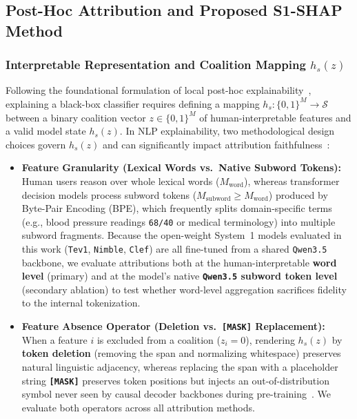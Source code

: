 \documentclass[10pt]{article}
\begin{document}
\subsection{Post-Hoc Attribution and Proposed S1-SHAP Method}
\label{sec:attribution-method}

\subsubsection{Interpretable Representation and Coalition Mapping \texorpdfstring{$h_s(z)$}{h\_s(z)}}
Following the foundational formulation of local post-hoc explainability~\cite{ribeiro2016,lundberg2017}, explaining a black-box classifier requires defining a mapping $h_s: \{0,1\}^M \to \mathcal{S}$ between a binary coalition vector $z \in \{0,1\}^M$ of human-interpretable features and a valid model state $h_s(z)$.
In NLP explainability, two methodological design choices govern $h_s(z)$ and can significantly impact attribution faithfulness~\cite{hooker2019,deyoung2020}:
\begin{itemize}
\item \textbf{Feature Granularity (Lexical Words vs.\ Native Subword Tokens):} Human users reason over whole lexical words ($M_{\text{word}}$), whereas transformer decision models process subword tokens ($M_{\text{subword}} \ge M_{\text{word}}$) produced by Byte-Pair Encoding (BPE), which frequently splits domain-specific terms (e.g., blood pressure readings \texttt{68/40} or medical terminology) into multiple subword fragments. Because the open-weight System~1 models evaluated in this work (\texttt{Tev1}, \texttt{Nimble}, \texttt{Clef}) are all fine-tuned from a shared \texttt{Qwen3.5} backbone, we evaluate attributions both at the human-interpretable \textbf{word level} (primary) and at the model's native \textbf{\texttt{Qwen3.5} subword token level} (secondary ablation) to test whether word-level aggregation sacrifices fidelity to the internal tokenization.
\item \textbf{Feature Absence Operator (Deletion vs.\ \texttt{[MASK]} Replacement):} When a feature $i$ is excluded from a coalition ($z_i = 0$), rendering $h_s(z)$ by \textbf{token deletion} (removing the span and normalizing whitespace) preserves natural linguistic adjacency, whereas replacing the span with a placeholder string \textbf{\texttt{[MASK]}} preserves token positions but injects an out-of-distribution symbol never seen by causal decoder backbones during pre-training~\cite{hooker2019}. We evaluate both operators across all attribution methods.
\end{itemize}
\end{document}
